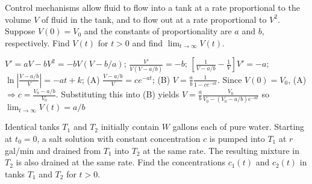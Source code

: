 \documentclass{ximera}
\begin{document}
\begin{problem}\label{exer:4.2.18}Control mechanisms allow fluid to flow into a tank
at a rate proportional to the volume $V$ of fluid in the tank, and to
flow
out at a rate proportional to $V^2$. Suppose $V(0)=V_0$ and the
constants of proportionality are $a$ and $b$, respectively.
Find $V(t)$  for $t>0$ and find $\lim_{t\to\infty}V(t)$.

\begin{solution}
$V'=aV-bV^2=-bV(V-b/a)$; $\frac{V'}{V(V-a/b)}=-b$;
$\left[\frac{1}{V-a/b}-\frac{1}{V}\right]V'=-a$;
$\ln\left|\frac{V-a/b}{V}\right|=-at+k$; (A) $\frac{V-a/b}{V}=ce^{-at}$; (B) $V=\frac{a}{b}\frac{1}{1-ce^{-at}}$. Since
$V(0)=V_0$,  (A) $\Rightarrow c=\frac{V_0-a/b}{V_0}$. Substituting
this into (B) yields
$V=\frac{a}{b}\frac{V_0}{V_0-\left(V_0-a/b
\right)e^{-at}}$ so $\lim_{t\to\infty}V(t)=a/b$
\end{solution}
\end{problem}

\begin{problem}\label{exer:4.2.19}
Identical tanks $T_1$ and $T_2$ initially contain $W$ gallons each of
pure water. Starting at $t_0=0$, a salt solution with constant
concentration $c$ is pumped into $T_1$ at $r$ gal/min and drained from
$T_1$ into $T_2$ at the same rate. The resulting mixture in $T_2$ is
also drained at the same rate. Find the concentrations $c_1(t)$
and $c_2(t)$ in tanks $T_1$ and $T_2$ for $t>0$.
\end{problem}
\end{document}
